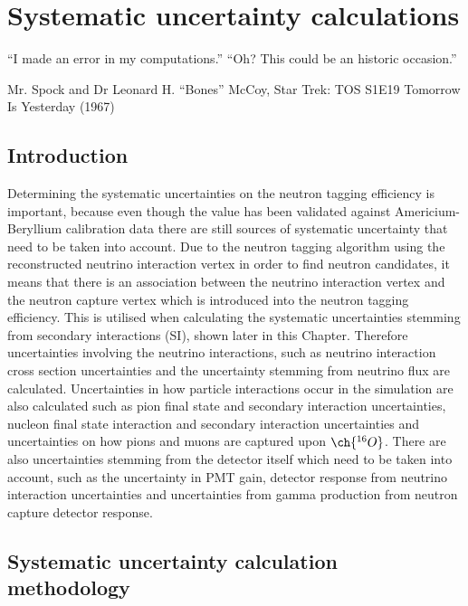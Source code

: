 \chapter{Systematic uncertainty calculations}
\epigraph{``I made an error in my computations.''\newline
``Oh? This could be an historic occasion.''}{Mr. Spock and Dr Leonard H. ``Bones'' McCoy, Star Trek: TOS S1E19 Tomorrow Is Yesterday (1967)}
\label{chp:syst}

\section{Introduction}

Determining the systematic uncertainties on the neutron tagging efficiency is important, because even though the value has been validated against Americium-Beryllium calibration data there are still sources of systematic uncertainty that need to be taken into account. Due to the neutron tagging algorithm using the reconstructed neutrino interaction vertex in order to find neutron candidates, it means that there is an association between the neutrino interaction vertex and the neutron capture vertex which is introduced into the neutron tagging efficiency. This is utilised when calculating the systematic uncertainties stemming from secondary interactions (SI), shown later in this Chapter. Therefore uncertainties involving the neutrino interactions, such as neutrino interaction cross section uncertainties and the uncertainty stemming from neutrino flux are calculated. Uncertainties in how particle interactions occur in the simulation are also calculated such as pion final state and secondary interaction uncertainties, nucleon final state interaction and secondary interaction uncertainties and uncertainties on how pions and muons are captured upon $\ch{^{16}O}$. There are also uncertainties stemming from the detector itself which need to be taken into account, such as the uncertainty in PMT gain, detector response from neutrino interaction uncertainties and uncertainties from gamma production from neutron capture detector response. 

\section{Systematic uncertainty calculation methodology}

